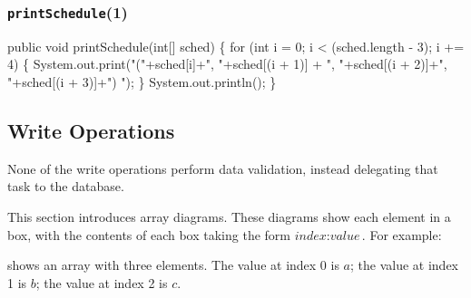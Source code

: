 \documentclass{article}
\def\nwendcode{\endtrivlist \endgroup}
\theoremstyle{definition}
\begin{document}
\nwendcode{}\subsubsection{{\tt{}\protect{}printSchedule}(1)}
\nwenddocs{}\endmoddef{}
public void printSchedule(int[] sched) \{
  for (int i = 0; i < (sched.length - 3); i += 4) \{
    System.out.print("("+sched[i]+", "+sched[(i + 1)]
      + ", "+sched[(i + 2)]+", "+sched[(i + 3)]+") ");
  \}
  System.out.println();
\}
\eatline
{}\nwendcode{}\subsection{Write Operations}
\label{sec:write-operations}
None of the write operations perform data validation, instead
delegating that task to the database.

This section introduces array diagrams. These diagrams show each element
in a box, with the contents of each box taking the form
$\textit{index}:\textit{value}$. For example:

\begin{figure}[h]
\centering
{}
\end{figure}

\noindent shows an array with three elements. The value at index 0 is $a$; the
value at index 1 is $b$; the value at index 2 is $c$.
\end{document}
